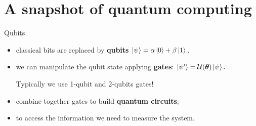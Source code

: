 \documentclass[8pt, xcolor={svgnames}, hyperref={linkcolor=amethyst}]{beamer}
\begin{document}
\section{A snapshot of quantum computing}

\begin{frame}{Qubits}
        \begin{itemize}[noitemsep]
           \item<2,3,4,5>[1.] classical bits are replaced by \textbf{qubits}
           $ \ket{\psi} = \alpha\ket{0}+\beta\ket{1}$.
           \item<3,4,5>[2.] we can manipulate the qubit state applying \textbf{gates}: $\ket{\psi'}=\mathcal{U}(\bm{\theta})\ket{\psi}.$

           Typically we use 1-qubit and 2-qubits gates!
           \item<4,5>[3.] combine together gates to build \textbf{quantum circuits};
           \item<5>[4.] to access the information we need to measure the system.
        \end{itemize}
        \begin{figure}

\end{figure}
\end{frame}
\end{document}
